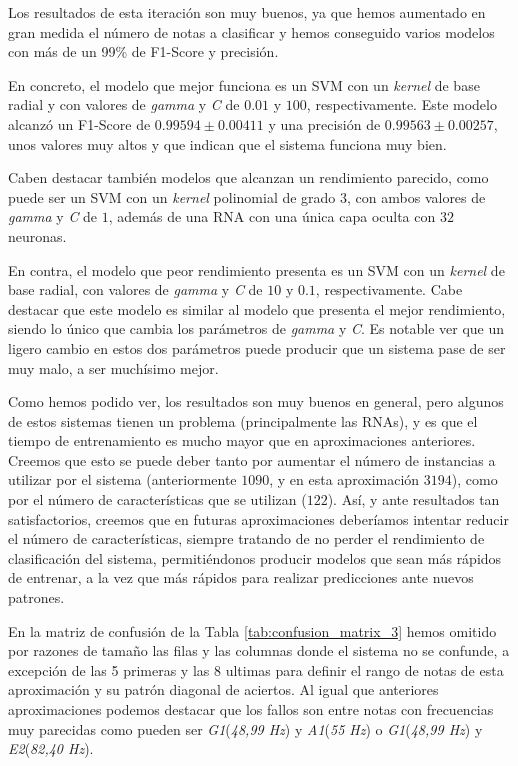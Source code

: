 \documentclass[12pt]{article}
\begin{document}
Los resultados de esta iteración son muy buenos, ya que hemos aumentado en gran medida el número de notas
a clasificar y hemos conseguido varios modelos con más de un 99\% de F1-Score y precisión. 

\bigskip
En concreto, el modelo que mejor funciona es un SVM con un \textit{kernel} de base radial y con valores de \textit{gamma} y
\textit{C} de $0.01$ y $100$, respectivamente. Este modelo alcanzó un F1-Score de 
$0.99594 \pm 0.00411$ y una precisión de $0.99563 \pm 0.00257$, unos valores muy altos y que indican
que el sistema funciona muy bien. 

\bigskip
Caben destacar también modelos que alcanzan un rendimiento parecido,
como puede ser un SVM con un \textit{kernel} polinomial de grado $3$, con ambos valores de \textit{gamma} y \textit{C} de $1$,
además de una RNA con una única capa oculta con $32$ neuronas.

\bigskip
En contra, el modelo que peor rendimiento presenta es un SVM con un \textit{kernel} de base radial,
con valores de \textit{gamma} y \textit{C} de $10$ y $0.1$, respectivamente. Cabe destacar que este modelo
es similar al modelo que presenta el mejor rendimiento, siendo lo único que cambia los parámetros de
\textit{gamma} y \textit{C}. Es notable ver que un ligero cambio en estos dos parámetros puede 
producir que un sistema pase de ser muy malo, a ser muchísimo mejor.

\bigskip
Como hemos podido ver, los resultados son muy buenos en general, pero algunos de estos sistemas tienen un problema (principalmente las RNAs),
y es que el tiempo de entrenamiento es mucho mayor que en aproximaciones anteriores. Creemos que esto se puede deber tanto por
aumentar el número de instancias a utilizar por el sistema (anteriormente $1090$, y en esta aproximación $3194$),
como por el número de características que se utilizan ($122$).
Así, y ante resultados tan satisfactorios, creemos que en futuras aproximaciones deberíamos intentar reducir el número de características, 
siempre tratando de no perder el rendimiento
de clasificación del sistema, permitiéndonos producir modelos que sean más rápidos de entrenar, a la vez que más rápidos
para realizar predicciones ante nuevos patrones.

\bigskip
En la matriz de confusión de la Tabla \ref{tab:confusion_matrix_3} hemos omitido por razones de tamaño las filas y las columnas donde 
el sistema no se confunde, a excepción de las 5 primeras y las 8 ultimas para definir el rango de notas de esta aproximación y su 
patrón diagonal de aciertos. Al igual que anteriores aproximaciones podemos destacar que los fallos son entre notas con frecuencias muy
parecidas como pueden ser \textit{G1}(\textit{48,99 Hz}) y \textit{A1}(\textit{55 Hz}) o \textit{G1}(\textit{48,99 Hz}) y \textit{E2}(\textit{82,40 Hz}).
\end{document}
